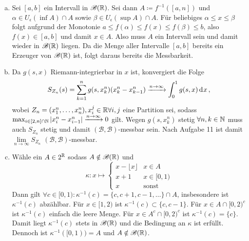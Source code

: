 \documentclass[uebung]{lecture}
\begin{document}
\begin{aufgabe}
    \begin{enumerate}[(a)]
        \item Sei $[a,b]$ ein Intervall in $\mathscr B(\mathbb{R})$. 
        Sei dann $A \coloneqq f^{-1}([a,n])$ und $\alpha \in U_\epsilon(\inf A) \cap A$ sowie $\beta \in U_\epsilon(\sup A) \cap A$.
        Für beliebiges $\alpha \le x \le \beta$ folgt aufgrund der Monotonie $a \leq f(\alpha) \le f(x) \le f(\beta) \le b$, 
        also $f(x) \in [a,b]$ und damit $x\in A$.
        Also muss $A$ ein Intervall sein und damit wieder in $\mathscr B(\mathbb{R})$ liegen.
        Da die Menge aller Intervalle $[a,b]$ bereits ein Erzeuger von $\mathscr B(\mathbb{R})$ ist, folgt daraus bereits die Messbarkeit.
        \item Da $g(s,x)$ Riemann-integrierbar in $x$ ist, konvergiert die Folge 
        \[
            S_{Z_n}(s) = \sum_{k = 1}^{n} g(s, x^n_k)(x^n_k - x^n_{k-1}) \xrightarrow{n \to \infty} \int_0^1g(s,x) \d x,
        \]
        wobei $Z_n = (x^n_1, \dots, x^n_n), x^j_i \in \mathbb{R} \forall i, j$ eine Partition sei, sodass 
        $\max_{i\in [2,n]\cap \mathbb{N}} |x^n_i - x^n_{i-1}| \xrightarrow{n \to \infty} 0$ gilt.
        Wegen $g(s,x^n_k)$ stetig $\forall n, k\in\mathbb{N}$ muss auch $S_{Z_n}$ stetig und damit $(\mathscr B, \mathscr B)$-messbar sein.
        Nach Aufgabe 11 ist damit $\lim\limits_{n \to \infty} S_{Z_n}$ $(\mathscr B, \mathscr B)$-messbar.
        \item Wähle ein $A \in 2^{\mathbb{R}}$ sodass $A \notin \mathscr B(\mathbb{R})$ und 
        \[
            \kappa\colon x \mapsto \begin{cases}
            x - \lfloor x\rfloor &x \in A\\
            x + 1 &x \in [0,1)\\
            x &\text{sonst}
        \end{cases}
        \]
        Dann gilt $\forall c \in [0,1)\colon\kappa ^{-1}(c) = \{c, c+1, c-1,\dots\} \cap A$, 
        insbesondere ist $\kappa^{-1}(c)$ abzählbar.
        Für $x \in [1,2)$ ist $\kappa^{-1}(c) \subset \{c, c-1\}$.
        Für $x \in A \cap [0,2)^c$ ist $\kappa^{-1}(c)$ einfach die leere Menge.
        Für $x\in A^c \cap [0,2)^c$ ist $\kappa^{-1}(c) = \{c\}$. 
        Damit liegt $\kappa^{-1}(c)$ stets in $\mathscr B(\mathbb{R})$ und die Bedingung an $\kappa$ ist erfüllt. 
        Dennoch ist $\kappa^{-1}([0,1)) = A$ und $A \notin \mathscr B(\mathbb{R})$.
    \end{enumerate}
\end{aufgabe}
\end{document}
